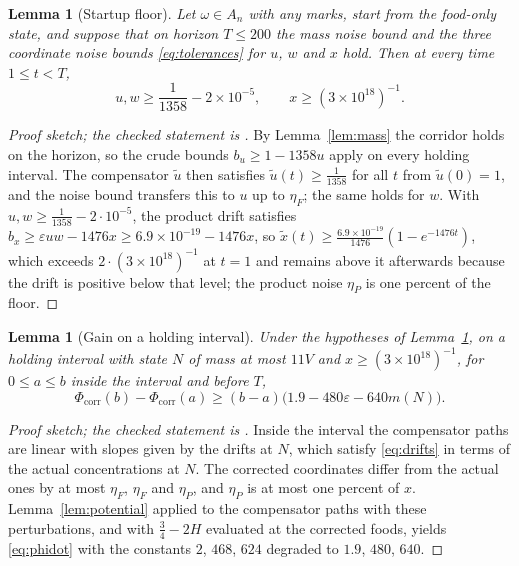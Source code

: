 \documentclass[11pt,letterpaper]{article}
\theoremstyle{plain}
\newtheorem{lemma}[theorem]{Lemma}
\theoremstyle{definition}
\theoremstyle{remark}
\numberwithin{equation}{section}
\newcommand{\eps}{\varepsilon}
\newcommand{\floorstock}{(3\times10^{18})^{-1}}
\newcommand{\corr}{\mathrm{corr}}
\begin{document}
\begin{lemma}[Startup floor]\label{lem:startup}
Let $\omega\in A_n$ with any marks, start from the food-only state, and suppose that on horizon $T\le200$ the mass noise bound and the three coordinate noise bounds \eqref{eq:tolerances} for $u$, $w$ and $x$ hold. Then at every time $1\le t<T$,
\begin{equation}\label{eq:floor}
 u,w\ge\frac1{1358}-2\times10^{-5},\qquad x\ge\floorstock .
\end{equation}
\end{lemma}
\begin{proof}[Proof sketch; the checked statement is ]
By Lemma~\ref{lem:mass} the corridor holds on the horizon, so the crude bounds $b_u\ge1-1358u$ apply on every holding interval. The compensator $\tilde u$ then satisfies $\tilde u(t)\ge\tfrac1{1358}$ for all $t$ from $\tilde u(0)=1$, and the noise bound transfers this to $u$ up to $\eta_F$; the same holds for $w$. With $u,w\ge\tfrac1{1358}-2\cdot10^{-5}$, the product drift satisfies $b_x\ge\eps uw-1476x\ge6.9\times10^{-19}-1476x$, so $\tilde x(t)\ge\frac{6.9\times10^{-19}}{1476}(1-e^{-1476t})$, which exceeds $2\cdot\floorstock$ at $t=1$ and remains above it afterwards because the drift is positive below that level; the product noise $\eta_P$ is one percent of the floor.
\end{proof}

\begin{lemma}[Gain on a holding interval]\label{lem:holding}
Under the hypotheses of Lemma~\ref{lem:startup}, on a holding interval with state $N$ of mass at most $11V$ and $x\ge\floorstock$, for $0\le a\le b$ inside the interval and before $T$,
\begin{equation}\label{eq:holdgain}
 \Phi_\corr(b)-\Phi_\corr(a)\ge(b-a)\bigl(1.9-480\eps-640m(N)\bigr).
\end{equation}
\end{lemma}
\begin{proof}[Proof sketch; the checked statement is ]
Inside the interval the compensator paths are linear with slopes given by the drifts at $N$, which satisfy \eqref{eq:drifts} in terms of the actual concentrations at $N$. The corrected coordinates differ from the actual ones by at most $\eta_F$, $\eta_F$ and $\eta_P$, and $\eta_P$ is at most one percent of $x$. Lemma~\ref{lem:potential} applied to the compensator paths with these perturbations, and with $\tfrac34-2H$ evaluated at the corrected foods, yields \eqref{eq:phidot} with the constants $2$, $468$, $624$ degraded to $1.9$, $480$, $640$.
\end{proof}
\end{document}
